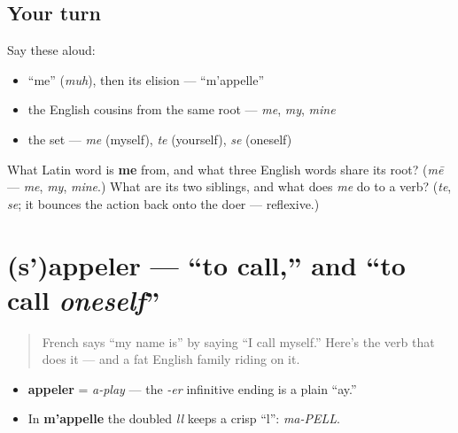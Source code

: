 \subsection*{Your turn}
Say these aloud:

\begin{itemize}
\raggedright
  \item \textquotedblleft{}me\textquotedblright{} (\emph{muh}), then its elision — \textquotedblleft{}m'appelle\textquotedblright{}
  \item the English cousins from the same root — \emph{me}, \emph{my}, \emph{mine}
  \item the set — \emph{me} (myself), \emph{te} (yourself), \emph{se} (oneself)
\end{itemize}

\begin{tcolorbox}[breakable,colback=teal!4,colframe=teal!35!black,title={Before you move on}]
What Latin word is \textbf{me} from, and what three English words share its root? (\emph{mē} — \emph{me}, \emph{my}, \emph{mine}.) What are its two siblings, and what does \emph{me} do to a verb? (\emph{te}, \emph{se}; it bounces the action back onto the doer — reflexive.)
\end{tcolorbox}
\section[(s')appeler]{(s')appeler — \textquotedblleft{}to call,\textquotedblright{} and \textquotedblleft{}to call \emph{oneself}\textquotedblright{}}

\label{lesson:FR-C02-appeler}



\begin{quote}
French says \textquotedblleft{}my name is\textquotedblright{} by saying \textquotedblleft{}I call myself.\textquotedblright{} Here's the verb that does it — and a fat English family riding on it.
\end{quote}

\begin{sounds}
\begin{itemize}
\raggedright
  \item \textbf{appeler} = \emph{a-play} — the \emph{-er} infinitive ending is a plain \textquotedblleft{}ay.\textquotedblright{}
  \item In \textbf{m'appelle} the doubled \emph{ll} keeps a crisp \textquotedblleft{}l\textquotedblright{}: \emph{ma-PELL}.
\end{itemize}
\end{sounds}

